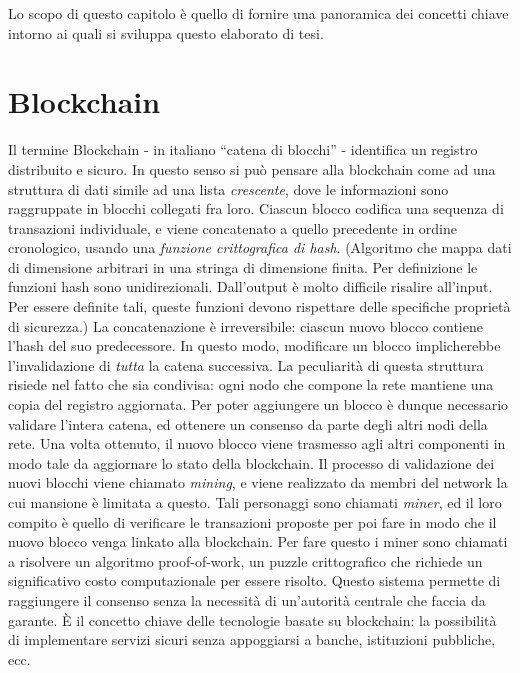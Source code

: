 
Lo scopo di questo capitolo è quello di fornire una panoramica dei concetti chiave intorno ai quali si sviluppa questo elaborato di tesi.

\section{Blockchain}

Il termine Blockchain - in italiano ``catena di blocchi'' - identifica un registro distribuito e sicuro. In questo senso si può pensare alla blockchain come ad una struttura di dati simile ad una lista \textit{crescente}, dove le informazioni sono raggruppate in blocchi collegati fra loro.\newline
Ciascun blocco codifica una sequenza di transazioni individuale, e viene concatenato a quello precedente in ordine cronologico, usando una \textit{funzione crittografica di hash}. (Algoritmo che mappa dati di dimensione arbitrari in una stringa di dimensione finita. Per definizione le funzioni hash sono unidirezionali. Dall'output è molto difficile risalire all'input. Per essere definite tali, queste funzioni devono rispettare delle specifiche proprietà di sicurezza.)
La concatenazione è irreversibile: ciascun nuovo blocco contiene l'hash del suo predecessore. In questo modo, modificare un blocco implicherebbe l'invalidazione di \emph{tutta} la catena successiva.\newline  
La peculiarità di questa struttura risiede nel fatto che sia condivisa: ogni nodo che compone la rete mantiene una copia del registro aggiornata. Per poter aggiungere un blocco è dunque necessario validare l'intera catena, ed ottenere un consenso da parte degli altri nodi della rete. Una volta ottenuto, il nuovo blocco viene trasmesso agli altri componenti in modo tale da aggiornare lo stato della blockchain.\newline
Il processo di validazione dei nuovi blocchi viene chiamato \textit{mining}, e viene realizzato da membri del network la cui mansione è limitata a questo. Tali personaggi sono chiamati \textit{miner}, ed il loro compito è quello di verificare le transazioni proposte per poi fare in modo che il nuovo blocco venga linkato alla blockchain. Per fare questo i miner sono chiamati a risolvere un algoritmo proof-of-work, un puzzle crittografico che richiede un significativo costo computazionale per essere risolto.\newline
Questo sistema permette di raggiungere il consenso senza la necessità di un'autorità centrale che faccia da garante. \`E il concetto chiave delle tecnologie basate su blockchain: la possibilità di implementare servizi sicuri senza appoggiarsi a banche, istituzioni pubbliche, ecc.\newline
